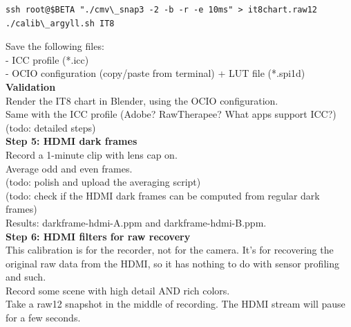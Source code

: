 \begin{lstlisting}[breaklines=true, breakatwhitespace=true]
ssh root@$BETA "./cmv\_snap3 -2 -b -r -e 10ms" > it8chart.raw12
./calib\_argyll.sh IT8
\end{lstlisting}

Save the following files:\\

- ICC profile (*.icc)\\
- OCIO configuration (copy/paste from terminal) + LUT file (*.spi1d)\\ 

\textbf{Validation}\\

Render the IT8 chart in Blender, using the OCIO configuration.\\

Same with the ICC profile (Adobe? RawTherapee? What apps support ICC?)\\

(todo: detailed steps)\\

\textbf{Step 5: HDMI dark frames }\\

Record a 1-minute clip with lens cap on.\\

Average odd and even frames.\\

(todo: polish and upload the averaging script)\\

(todo: check if the HDMI dark frames can be computed from regular dark frames)\\

Results: darkframe-hdmi-A.ppm and darkframe-hdmi-B.ppm.\\

\textbf{Step 6: HDMI filters for raw recovery }\\

This calibration is for the recorder, not for the camera. It's for recovering the original raw data from the HDMI, so it has nothing to do with sensor profiling and such.\\

Record some scene with high detail AND rich colors.\\

Take a raw12 snapshot in the middle of recording. The HDMI stream will pause for a few seconds.\\

